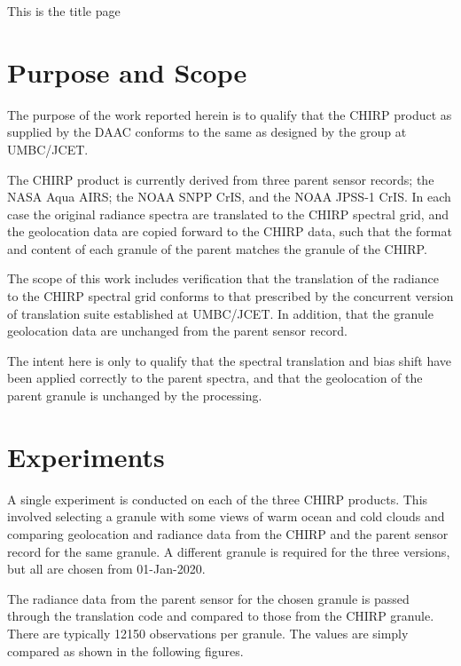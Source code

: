 \documentclass[11pt]{article}
\author{chris hepplewhite}
\date{\today}
\title{}
\begin{document}
\tableofcontents

\begin{titlepage}
 
This is the title page

\end{titlepage}


\section{Purpose and Scope}
\label{sec:org143a6d7}

The purpose of the work reported herein is to qualify that the CHIRP product as supplied
by the DAAC conforms to the same as designed by the group at UMBC/JCET.

The CHIRP product is currently derived from three parent sensor records; the NASA Aqua AIRS; the
NOAA SNPP CrIS, and the NOAA JPSS-1 CrIS. In each case the original radiance spectra are 
translated to the CHIRP spectral grid, and the geolocation data are copied forward to the
CHIRP data, such that the format and content of each granule of the parent matches the granule
of the CHIRP.

The scope of this work includes verification that the translation of the radiance to the
CHIRP spectral grid conforms to that prescribed by the concurrent version of translation
suite established at UMBC/JCET. In addition, that the granule geolocation data are unchanged
from the parent sensor record.

The intent here is only to qualify that the spectral translation and bias shift have been
applied correctly to the parent spectra, and that the geolocation of the parent granule
is unchanged by the processing.


\section{Experiments}
\label{sec:org592b646}

A single experiment is conducted on each of the three CHIRP products. This involved
selecting a granule with some views of warm ocean and cold clouds and comparing geolocation
and radiance data from the CHIRP and the parent sensor record for the same granule.
A different granule is required for the three versions, but all are chosen from 
01-Jan-2020.

The radiance data from the parent sensor for the chosen granule is passed through the
translation code and compared to those from the CHIRP granule. There are typically 12150
observations per granule. The values are simply compared as shown in the following figures.
\end{document}
